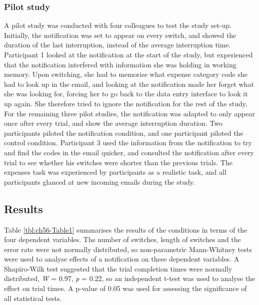 \subsubsection{Pilot study}
A pilot study was conducted with four colleagues to test the study set-up. Initially, the notification was set to appear on every switch, and showed the duration of the last interruption, instead of the average interruption time. Participant 1 looked at the notification at the start of the study, but experienced that the notification interfered with information she was holding in working memory. Upon switching, she had to memorise what expense category code she had to look up in the email, and looking at the notification made her forget what she was looking for, forcing her to go back to the data entry interface to look it up again. She therefore tried to ignore the notification for the rest of the study. For the remaining three pilot studies, the notification was adapted to only appear once after every trial, and show the average interruption duration. Two participants piloted the notification condition, and one participant piloted the control condition. Participant 3 used the information from the notification to try and find the codes in the email quicker, and consulted the notification after every trial to see whether his switches were shorter than the previous trials. The expenses task was experienced by participants as a realistic task, and all participants glanced at new incoming emails during the study.

\subsection{Results}
Table \ref{tbl:ch56-Table1} summarises the results of the conditions in terms of the four dependent variables. The number of switches, length of switches and the error rate were not normally distributed, so non-parametric Mann-Whitney tests were used to analyse effects of a notification on these dependent variables. A Shapiro-Wilk test suggested that the trial completion times were normally distributed, \textit{W} = 0.97, \textit{p} = 0.22, so an independent t-test was used to analyse the effect on trial times. A p-value of 0.05 was used for assessing the significance of all statistical tests. 

